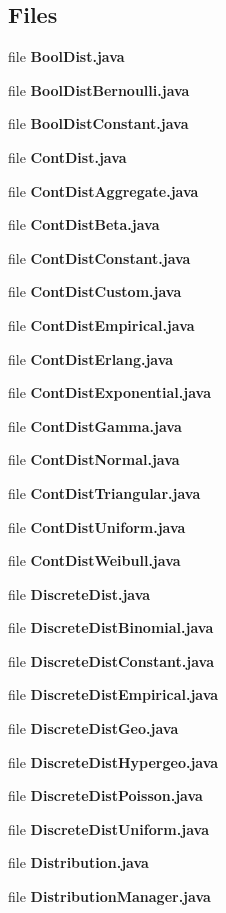 \subsection*{Files}
\begin{DoxyCompactItemize}
\item 
file {\bfseries Bool\-Dist.\-java}
\item 
file {\bfseries Bool\-Dist\-Bernoulli.\-java}
\item 
file {\bfseries Bool\-Dist\-Constant.\-java}
\item 
file {\bfseries Cont\-Dist.\-java}
\item 
file {\bfseries Cont\-Dist\-Aggregate.\-java}
\item 
file {\bfseries Cont\-Dist\-Beta.\-java}
\item 
file {\bfseries Cont\-Dist\-Constant.\-java}
\item 
file {\bfseries Cont\-Dist\-Custom.\-java}
\item 
file {\bfseries Cont\-Dist\-Empirical.\-java}
\item 
file {\bfseries Cont\-Dist\-Erlang.\-java}
\item 
file {\bfseries Cont\-Dist\-Exponential.\-java}
\item 
file {\bfseries Cont\-Dist\-Gamma.\-java}
\item 
file {\bfseries Cont\-Dist\-Normal.\-java}
\item 
file {\bfseries Cont\-Dist\-Triangular.\-java}
\item 
file {\bfseries Cont\-Dist\-Uniform.\-java}
\item 
file {\bfseries Cont\-Dist\-Weibull.\-java}
\item 
file {\bfseries Discrete\-Dist.\-java}
\item 
file {\bfseries Discrete\-Dist\-Binomial.\-java}
\item 
file {\bfseries Discrete\-Dist\-Constant.\-java}
\item 
file {\bfseries Discrete\-Dist\-Empirical.\-java}
\item 
file {\bfseries Discrete\-Dist\-Geo.\-java}
\item 
file {\bfseries Discrete\-Dist\-Hypergeo.\-java}
\item 
file {\bfseries Discrete\-Dist\-Poisson.\-java}
\item 
file {\bfseries Discrete\-Dist\-Uniform.\-java}
\item 
file {\bfseries Distribution.\-java}
\item 
file {\bfseries Distribution\-Manager.\-java}

\end{DoxyCompactItemize}
